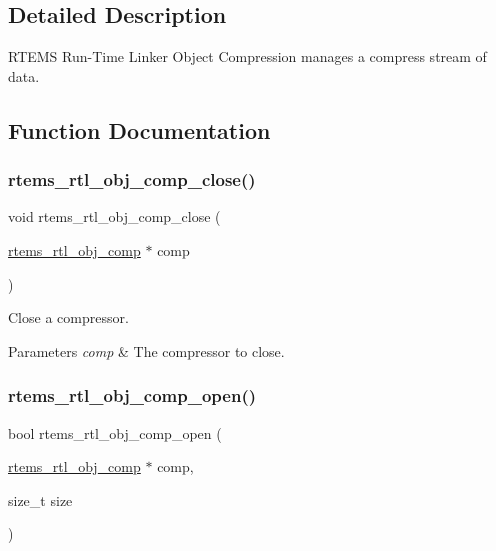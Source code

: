 \subsection{Detailed Description}
R\+T\+E\+MS Run-\/\+Time Linker Object Compression manages a compress stream of data. 



\subsection{Function Documentation}
\mbox{\label{rtl-obj-comp_8c_aa623f3df8f95696261fe1f558bff7873}} 
\subsubsection{\texorpdfstring{rtems\_rtl\_obj\_comp\_close()}{rtems\_rtl\_obj\_comp\_close()}}
{\footnotesize\ttfamily void rtems\+\_\+rtl\+\_\+obj\+\_\+comp\+\_\+close (\begin{DoxyParamCaption}\item[{\mbox{\hyperlink{rtl-obj-comp_8h_a5ac76d7cdc14a520157bd5c8a322f56c}{rtems\+\_\+rtl\+\_\+obj\+\_\+comp}} $\ast$}]{comp }\end{DoxyParamCaption})}

Close a compressor.


\begin{DoxyParams}{Parameters}
{\em comp} & The compressor to close. \\
\hline
\end{DoxyParams}
\mbox{\label{rtl-obj-comp_8c_ae57c7af4f1fefa9e13f9ed00eb01dcf3}} 
\subsubsection{\texorpdfstring{rtems\_rtl\_obj\_comp\_open()}{rtems\_rtl\_obj\_comp\_open()}}
{\footnotesize\ttfamily bool rtems\+\_\+rtl\+\_\+obj\+\_\+comp\+\_\+open (\begin{DoxyParamCaption}\item[{\mbox{\hyperlink{rtl-obj-comp_8h_a5ac76d7cdc14a520157bd5c8a322f56c}{rtems\+\_\+rtl\+\_\+obj\+\_\+comp}} $\ast$}]{comp,  }\item[{size\+\_\+t}]{size }\end{DoxyParamCaption})}

